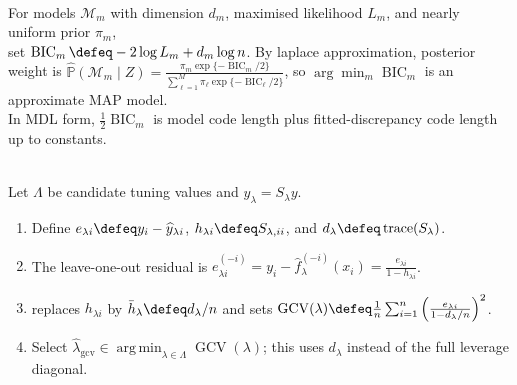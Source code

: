 \begin{remark} \label{rem:sl-bic-bayesian-mdl-view} \\
For models $\mathcal{M}_m$ with dimension $d_m$, maximised likelihood $L_m$, and nearly uniform prior $\pi_m$,\\
set $\operatorname{BIC}_m\defeq-2\log L_m+d_m\log n$. By laplace approximation, posterior weight is $\widehat{\mathbb{P}}(\mathcal{M}_m\mid Z)=\frac{\pi_m\exp\{-\operatorname{BIC}_m/2\}}{\sum_{\ell=1}^M\pi_\ell\exp\{-\operatorname{BIC}_\ell/2\}}$, so $\arg\min_m\operatorname{BIC}_m$ is an approximate MAP model.\\
In MDL form, $\frac12\operatorname{BIC}_m$ is model code length plus fitted-discrepancy code length up to constants.
\end{remark}

\begin{method} \label{meth:sl-generalized-cross-validation} \\
Let $\Lambda$ be candidate tuning values and $\widehat{y}_\lambda=S_\lambda y$.
\begin{enumerate}[label=(\roman*)]
\setlength{\itemsep}{0pt}
\item Define $e_{\lambda i}\defeq y_i-\widehat{y}_{\lambda i}$, $h_{\lambda i}\defeq S_{\lambda,ii}$, and $d_\lambda\defeq\operatorname{trace}(S_\lambda)$.
\item The leave-one-out residual is $e^{(-i)}_{\lambda i}=y_i-\widehat{f}^{(-i)}_\lambda(x_i)=\frac{e_{\lambda i}}{1-h_{\lambda i}}$.
\item {} replaces $h_{\lambda i}$ by $\bar h_\lambda\defeq d_\lambda/n$ and sets $\operatorname{GCV}(\lambda)\defeq\frac{1}{n}\sum_{i=1}^n\left(\frac{e_{\lambda i}}{1-d_\lambda/n}\right)^2$.
\item Select $\widehat{\lambda}_{\mathrm{gcv}}\in\operatorname*{arg\,min}_{\lambda\in\Lambda}\operatorname{GCV}(\lambda)$; this uses $d_\lambda$ instead of the full leverage diagonal.
\end{enumerate}
\end{method}
